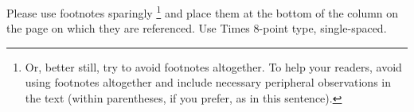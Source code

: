 \documentclass[times, 10pt,twocolumn]{article}
\begin{document}

Please use footnotes sparingly%
\footnote
   {%
     Or, better still, try to avoid footnotes altogether.  To help your 
     readers, avoid using footnotes altogether and include necessary 
     peripheral observations in the text (within parentheses, if you 
     prefer, as in this sentence).
   }
and place them at the bottom of the column on the page on which they are 
referenced. Use Times 8-point type, single-spaced.






\end{document}
